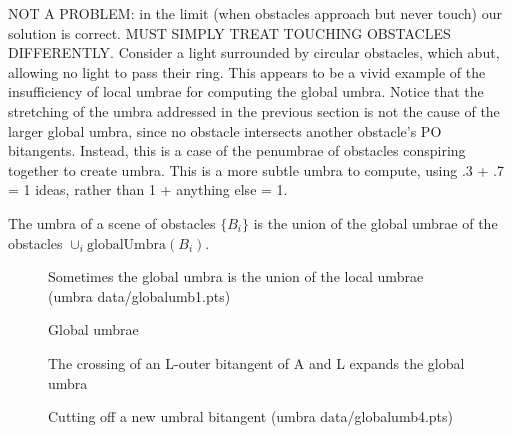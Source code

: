 \documentclass[12pt]{article}
\begin{document}

\begin{rmk}
NOT A PROBLEM: in the limit (when obstacles approach but never touch) our solution is correct.
MUST SIMPLY TREAT TOUCHING OBSTACLES DIFFERENTLY.
Consider a light surrounded by circular obstacles, which abut, allowing no
light to pass their ring.
This appears to be a vivid example of the insufficiency of local umbrae for computing
the global umbra.
Notice that the stretching of the umbra addressed in the previous section
is not the cause of the larger global umbra, since no obstacle intersects
another obstacle's PO bitangents.
Instead, this is a case of the penumbrae of obstacles conspiring together
to create umbra.
This is a more subtle umbra to compute, using .3 + .7 = 1 ideas,
rather than 1 + anything else = 1.
\end{rmk}

\begin{lemma}
The umbra of a scene of obstacles $\{B_i\}$ is the union of the 
global umbrae of the obstacles $\cup_i \mbox{globalUmbra}(B_i)$.
\end{lemma}

\begin{figure}[hb]
\caption{Sometimes the global umbra is the union of the local umbrae (umbra data/globalumb1.pts)}
\label{fig:globalumb1}
\end{figure}

\begin{figure}
\centerline{}
\caption{Global umbrae}
\label{fig:globalumb2}
\end{figure}

\begin{figure}
\centerline{}
\caption{The crossing of an L-outer bitangent of A and L expands the global umbra}
\label{fig:globalumb2PO}
\end{figure}

\begin{figure}
\caption{Cutting off a new umbral bitangent (umbra data/globalumb4.pts)}
\label{fig:globalumb4}
\end{figure}
\end{document}
